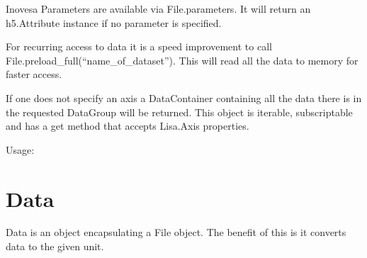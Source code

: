 \documentclass[letterpaper,10pt,openany,oneside,english]{sphinxmanual}
\begin{document}
Inovesa Parameters are available via File.parameters. It will return an h5.Attribute instance if no
parameter is specified.

For recurring access to data it is a speed improvement to call File.preload\_full(“name\_of\_dataset”).
This will read all the data to memory for faster access.

If one does not specify an axis a DataContainer containing all the data there is in the requested DataGroup
will be returned. This object is iterable, subscriptable and has a get method that accepts Lisa.Axis properties.

Usage:

\begin{sphinxVerbatim}[commandchars=\\\{\}]
 
  
  
  
\end{sphinxVerbatim}


\section{Data}
\label{\detokenize{simpleusage:data}}
Data is an object encapsulating a File object. The benefit of this is it converts data to the given unit.

\begin{sphinxVerbatim}[commandchars=\\\{\}]
 
  
   
   
   
\end{sphinxVerbatim}
\end{document}
